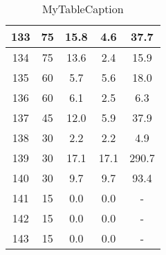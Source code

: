 \documentclass[a4paper,10pt]{article}
\begin{document}
\begin{table}
\begin{tabular}{|c|c|c|c|c|}
\hline
133 & 75 & 15.8 & 4.6 & 37.7 \\
\hline
134 & 75 & 13.6 & 2.4 & 15.9 \\
\hline
135 & 60 & 5.7 & 5.6 & 18.0 \\
\hline
136 & 60 & 6.1 & 2.5 & 6.3 \\
\hline
137 & 45 & 12.0 & 5.9 & 37.9 \\
\hline
138 & 30 & 2.2 & 2.2 & 4.9 \\
\hline
139 & 30 & 17.1 & 17.1 & 290.7 \\
\hline
140 & 30 & 9.7 & 9.7 & 93.4 \\
\hline
141 & 15 & 0.0 & 0.0 & - \\
\hline
142 & 15 & 0.0 & 0.0 & - \\
\hline
143 & 15 & 0.0 & 0.0 & - \\
\hline
\end{tabular}
\caption{MyTableCaption}
\label{table:MyTableLabel}
\end{table}
\end{document}
